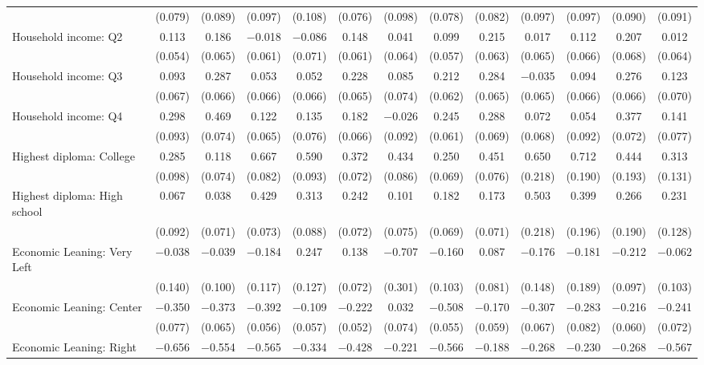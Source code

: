 \begin{tabular}{@{\extracolsep{5pt}}lcccccccccccc}
  & (0.079) & (0.089) & (0.097) & (0.108) & (0.076) & (0.098) & (0.078) & (0.082) & (0.097) & (0.097) & (0.090) & (0.091) \\ 
  Household income: Q2 & 0.113 & 0.186 & $-$0.018 & $-$0.086 & 0.148 & 0.041 & 0.099 & 0.215 & 0.017 & 0.112 & 0.207 & 0.012 \\ 
  & (0.054) & (0.065) & (0.061) & (0.071) & (0.061) & (0.064) & (0.057) & (0.063) & (0.065) & (0.066) & (0.068) & (0.064) \\ 
  Household income: Q3 & 0.093 & 0.287 & 0.053 & 0.052 & 0.228 & 0.085 & 0.212 & 0.284 & $-$0.035 & 0.094 & 0.276 & 0.123 \\ 
  & (0.067) & (0.066) & (0.066) & (0.066) & (0.065) & (0.074) & (0.062) & (0.065) & (0.065) & (0.066) & (0.066) & (0.070) \\ 
  Household income: Q4 & 0.298 & 0.469 & 0.122 & 0.135 & 0.182 & $-$0.026 & 0.245 & 0.288 & 0.072 & 0.054 & 0.377 & 0.141 \\ 
  & (0.093) & (0.074) & (0.065) & (0.076) & (0.066) & (0.092) & (0.061) & (0.069) & (0.068) & (0.092) & (0.072) & (0.077) \\ 
  Highest diploma: College & 0.285 & 0.118 & 0.667 & 0.590 & 0.372 & 0.434 & 0.250 & 0.451 & 0.650 & 0.712 & 0.444 & 0.313 \\ 
  & (0.098) & (0.074) & (0.082) & (0.093) & (0.072) & (0.086) & (0.069) & (0.076) & (0.218) & (0.190) & (0.193) & (0.131) \\ 
  Highest diploma: High school & 0.067 & 0.038 & 0.429 & 0.313 & 0.242 & 0.101 & 0.182 & 0.173 & 0.503 & 0.399 & 0.266 & 0.231 \\ 
  & (0.092) & (0.071) & (0.073) & (0.088) & (0.072) & (0.075) & (0.069) & (0.071) & (0.218) & (0.196) & (0.190) & (0.128) \\ 
  Economic Leaning: Very Left & $-$0.038 & $-$0.039 & $-$0.184 & 0.247 & 0.138 & $-$0.707 & $-$0.160 & 0.087 & $-$0.176 & $-$0.181 & $-$0.212 & $-$0.062 \\ 
  & (0.140) & (0.100) & (0.117) & (0.127) & (0.072) & (0.301) & (0.103) & (0.081) & (0.148) & (0.189) & (0.097) & (0.103) \\ 
  Economic Leaning: Center & $-$0.350 & $-$0.373 & $-$0.392 & $-$0.109 & $-$0.222 & 0.032 & $-$0.508 & $-$0.170 & $-$0.307 & $-$0.283 & $-$0.216 & $-$0.241 \\ 
  & (0.077) & (0.065) & (0.056) & (0.057) & (0.052) & (0.074) & (0.055) & (0.059) & (0.067) & (0.082) & (0.060) & (0.072) \\ 
  Economic Leaning: Right & $-$0.656 & $-$0.554 & $-$0.565 & $-$0.334 & $-$0.428 & $-$0.221 & $-$0.566 & $-$0.188 & $-$0.268 & $-$0.230 & $-$0.268 & $-$0.567 \\ 

\end{tabular}
